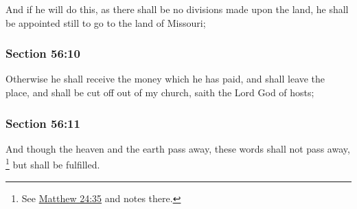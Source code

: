 		And if he will do this, as there shall be no divisions made upon the land, he shall be appointed still to go to the land of Missouri;


	\subsubsection{Section 56:10} %
		\label{DC56-10}

		Otherwise he shall receive the money which he has paid, and shall leave the place, and shall be cut off out of my church, saith the Lord God of hosts;


	\subsubsection{Section 56:11} %
		\label{DC56-11}

		And though the heaven and the earth pass away, these words shall not pass away,%
			\footnote{%
				See \hyperref[MATTHEW-24-35]{Matthew 24:35} and notes there.
				}
		but shall be fulfilled.


